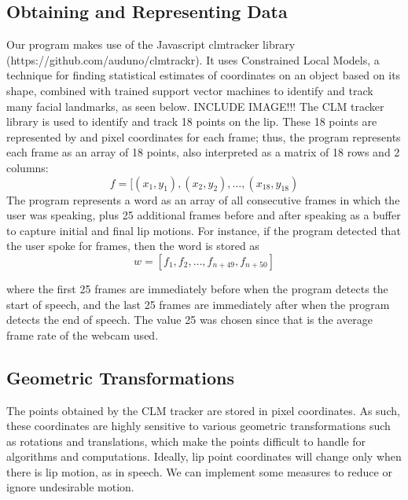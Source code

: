 \documentclass[10pt,twocolumn,letterpaper]{article}
\begin{document}
\subsection{Obtaining and Representing Data}
Our program makes use of the Javascript clmtracker library (https://github.com/auduno/clmtrackr).
It uses Constrained Local Models, a technique for finding statistical estimates of coordinates on an object based on its shape, combined with trained support vector machines to identify and track many facial landmarks, as seen below.
INCLUDE IMAGE!!!
The CLM tracker library is used to identify and track 18 points on the lip. These 18 points are represented by and pixel coordinates for each frame; thus, the program represents each frame as an array of 18 points, also interpreted as a matrix of 18 rows and 2 columns:
\begin{equation}
  f = [(x_1, y_1), (x_2, y_2), \ldots, (x_{18}, y_{18})
\end{equation}
The program represents a word as an array of all consecutive frames in which the user was speaking, plus 25 additional frames before and after speaking as a buffer to capture initial and final lip motions. For instance, if the program detected that the user spoke for frames, then the word is stored as
\begin{equation}
  w = [f_1, f_2, \ldots, f_{n+49}, f_{n+50}]
\end{equation}

where the first 25 frames are immediately before when the program detects the start of speech, and the last 25 frames are immediately after when the program detects the end of speech. The value 25 was chosen since that is the average frame rate of the webcam used.
\subsection{Geometric Transformations}
The points obtained by the CLM tracker are stored in pixel coordinates. As such, these coordinates are highly sensitive to various geometric transformations such as rotations and translations, which make the points difficult to handle for algorithms and computations. Ideally, lip point coordinates will change only when there is lip motion, as in speech. We can implement some measures to reduce or ignore undesirable motion.
\end{document}
